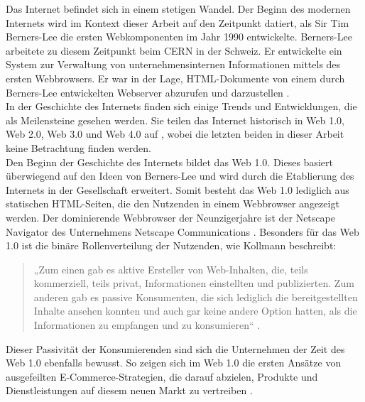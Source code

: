 \documentclass[a4paper]{scrartcl}
\begin{document}
Das Internet befindet sich in einem stetigen Wandel. Der Beginn des modernen Internets wird im Kontext dieser Arbeit auf den Zeitpunkt datiert, als Sir Tim Berners-Lee die ersten Webkomponenten im Jahr 1990 entwickelte. Berners-Lee arbeitete zu diesem Zeitpunkt beim CERN in der Schweiz. Er entwickelte ein System zur Verwaltung von unternehmensinternen Informationen mittels des ersten Webbrowsers. Er war in der Lage, HTML-Dokumente von einem durch Berners-Lee entwickelten Webserver abzurufen und darzustellen \autocite{Berners-Lee}. \\
In der Geschichte des Internets finden sich einige Trends und Entwicklungen, die als Meilensteine gesehen werden. Sie teilen das Internet historisch in Web 1.0, Web 2.0, Web 3.0 und Web 4.0 auf \autocite[133]{Kollmann}, wobei die letzten beiden in dieser Arbeit keine Betrachtung finden werden. \\
Den Beginn der Geschichte des Internets bildet das Web 1.0. Dieses basiert überwiegend auf den Ideen von Berners-Lee und wird durch die Etablierung des Internets in der Gesellschaft erweitert. Somit besteht das Web 1.0 lediglich aus statischen HTML-Seiten, die den Nutzenden in einem Webbrowser angezeigt werden. Der dominierende Webbrowser der Neunzigerjahre ist der Netscape Navigator des Unternehmens Netscape Communications \autocite{Oreilly}. Besonders für das Web 1.0 ist die binäre Rollenverteilung der Nutzenden, wie Kollmann beschreibt:
\begin{quote}
	„Zum einen gab es aktive Ersteller von Web-Inhalten, die, teils kommerziell, teils privat, Informationen einstellten und publizierten. Zum anderen gab es passive Konsumenten, die sich lediglich die bereitgestellten Inhalte ansehen konnten und auch gar keine andere Option hatten, als die Informationen zu empfangen und zu konsumieren“ \autocite[134]{Kollmann}.
\end{quote}
Dieser Passivität der Konsumierenden sind sich die Unternehmen der Zeit des Web 1.0 ebenfalls bewusst. So zeigen sich im Web 1.0 die ersten Ansätze von ausgefeilten E-Commerce-Strategien, die darauf abzielen, Produkte und Dienstleistungen auf diesem neuen Markt zu vertreiben \autocite[1204]{Kollmann_Lomberg}. \\
\end{document}
